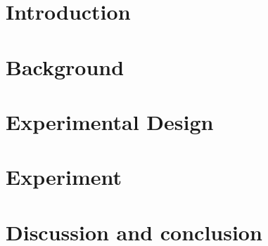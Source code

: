 \documentclass[12pt,twoside]{report}
\begin{document}
\chapter{Introduction}


\chapter{Background}


%
%
\chapter{Experimental Design}


\chapter{Experiment}


\chapter{Discussion and conclusion}


%





\end{document}
